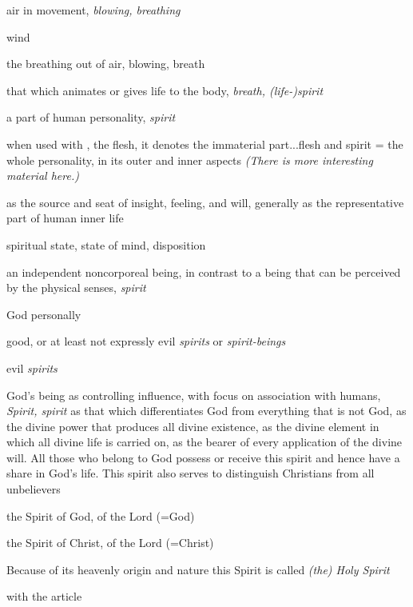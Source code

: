 				\begin{compactdesc}
					\item[BDAG 738b] \textbf{}
						\begin{compactitem}
							\item[1] air in movement, \textit{blowing, breathing}
							\item[1a] wind
							\item[1b] the breathing out of air, blowing, breath
							\item[2] that which animates or gives life to the body, \textit{breath, (life-)spirit}
							\item[3] a part of human personality, \textit{spirit}
							\item[3a] when used with , the flesh, it denotes the immaterial part...flesh and spirit = the whole personality, in its outer and inner aspects \textit{(There is more interesting material here.)}
							\item[3b] as the source and seat of insight, feeling, and will, generally as the representative part of human inner life
							\item[3c] spiritual state, state of mind, disposition
							\item[4] an independent noncorporeal being, in contrast to a being that can be perceived by the physical senses, \textit{spirit}
							\item[4a] God personally
							\item[4b] good, or at least not expressly evil \textit{spirits} or \textit{spirit-beings}
							\item[4c] evil \textit{spirits}
							\item[5] God's being as controlling influence, with focus on association with humans, \textit{Spirit, spirit} as that which differentiates God from everything that is not God, as the divine power that produces all divine existence, as the divine element in which all divine life is carried on, as the bearer of every application of the divine will. All those who belong to God possess or receive this spirit and hence have a share in God's life. This spirit also serves to distinguish Christians from all unbelievers
							\item[5a] the Spirit of God, of the Lord (=God)
							\item[5b] the Spirit of Christ, of the Lord (=Christ)
							\item[5c] Because of its heavenly origin and nature this Spirit is called \textit{(the) Holy Spirit}
							\item[5c$\alpha$] with the article 

\end{compactitem}
\end{compactdesc}
